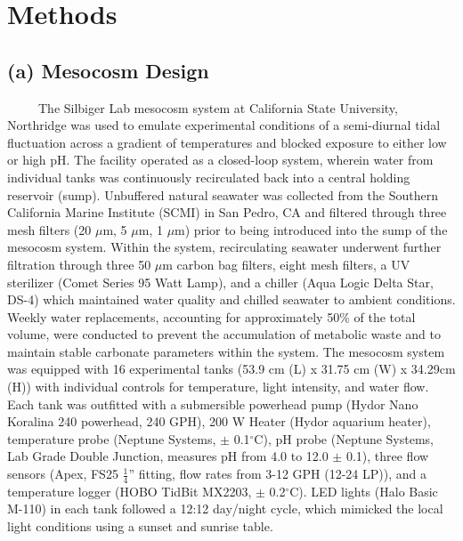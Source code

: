 \documentclass[
]{article}
\author{}
\date{\vspace{-2.5em}}
\begin{document}
\hypertarget{methods}{%
\section{Methods}\label{methods}}

\vspace{0.5cm}

\hypertarget{a-mesocosm-design}{%
\subsection{(a) Mesocosm Design}\label{a-mesocosm-design}}

~~~~~The Silbiger Lab mesocosm system at California State University,
Northridge was used to emulate experimental conditions of a semi-diurnal
tidal fluctuation across a gradient of temperatures and blocked exposure
to either low or high pH. The facility operated as a closed-loop system,
wherein water from individual tanks was continuously recirculated back
into a central holding reservoir (sump). Unbuffered natural seawater was
collected from the Southern California Marine Institute (SCMI) in San
Pedro, CA and filtered through three mesh filters (20 \(\mu\)m, 5
\(\mu\)m, 1 \(\mu\)m) prior to being introduced into the sump of the
mesocosm system. Within the system, recirculating seawater underwent
further filtration through three 50 \(\mu\)m carbon bag filters, eight
mesh filters, a UV sterilizer (Comet Series 95 Watt Lamp), and a chiller
(Aqua Logic Delta Star, DS-4) which maintained water quality and chilled
seawater to ambient conditions. Weekly water replacements, accounting
for approximately 50\% of the total volume, were conducted to prevent
the accumulation of metabolic waste and to maintain stable carbonate
parameters within the system. The mesocosm system was equipped with 16
experimental tanks (53.9 cm (L) x 31.75 cm (W) x 34.29cm (H)) with
individual controls for temperature, light intensity, and water flow.
Each tank was outfitted with a submersible powerhead pump (Hydor Nano
Koralina 240 powerhead, 240 GPH), 200 W Heater (Hydor aquarium heater),
temperature probe (Neptune Systems, \(\pm\) 0.1\(^\circ\)C), pH probe
(Neptune Systems, Lab Grade Double Junction, measures pH from 4.0 to
12.0 \(\pm\) 0.1), three flow sensors (Apex, FS25 \(\frac{1}{4}\)''
fitting, flow rates from 3-12 GPH (12-24 LP)), and a temperature logger
(HOBO TidBit MX2203, \(\pm\) 0.2\(^\circ\)C). LED lights (Halo Basic
M-110) in each tank followed a 12:12 day/night cycle, which mimicked the
local light conditions using a sunset and sunrise table.
\end{document}
